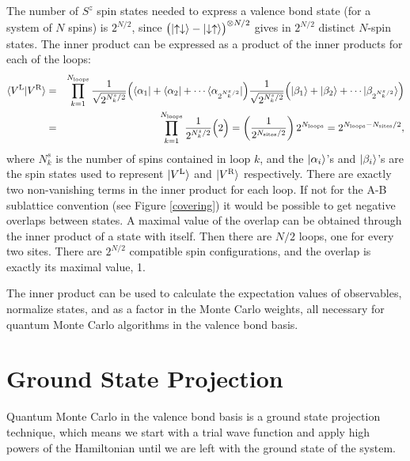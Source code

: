 The number of $S^z$ spin states needed to express a valence bond state (for a system of $N$ spins) is $2^{N/2}$, since $\big(\lvert {\uparrow\downarrow} \rangle-\lvert {\downarrow\uparrow} \rangle \big)^{\otimes N/2}$ gives in $2^{N/2}$ distinct $N$-spin states. 
The inner product can be expressed as a product of the inner products for each of the loops:
\begin{eqnarray}
\label{innprod}
\langle{V^\text{L}}\vert{V^\text{R}}\rangle &= &
				\prod^{N_{\text{loops}}}_{k=1}
				\frac{1}
				{\sqrt{2^{N^s_k/2}}}
				\Big( \langle {\alpha_1} \rvert + \langle {\alpha_2} \rvert + \cdots \langle {\alpha_{2^{N^s_k/2}}} \rvert\Big)
				\frac{1}
				{\sqrt{2^{N^s_k/2}}} \nonumber
				\Big( \lvert {\beta_1} \rangle + \lvert {\beta_2} \rangle + \cdots \lvert {\beta_{2^{N^s_k/2}}} \rangle\Big)\\
				&=&\prod^{N_{\text{loops}}}_{k=1}
				\frac{1}
				{2^{N^s_k/2}}
				\Big( 2\Big)
				= \left(\frac{1}
				{2^{N_{\text{sites}}/2}}\right)
				 2^{N_{\text{loops}}} 
				 = 2^{N_{\text{loops}} - N_{\text{sites}}/2},
\end{eqnarray}
where $N^s_k$ is the number of spins contained in loop $k$, and the $\lvert {\alpha_i} \rangle$'s and 
$\lvert {\beta_i} \rangle$'s are the spin states used to represent $\lvert {V^\text{L}} \rangle$ and $\lvert {V^\text{R}} \rangle$ respectively.
There are exactly two non-vanishing terms in the inner product for each loop.
If not for the A-B sublattice convention (see Figure \ref{covering}) it would be possible to get negative overlaps between states.
A maximal value of the overlap can be obtained through the inner product of a state with itself.
Then there are $N/2$ loops, one for every two sites.  There are $2^{N/2}$ compatible spin configurations, and the overlap is exactly its maximal value, 1.

The inner product can be used to calculate the expectation values of observables, normalize states, and as a factor in the Monte Carlo weights, all necessary for quantum Monte Carlo algorithms in the valence bond basis. 

\section{Ground State Projection} \label{gsp}

Quantum Monte Carlo in the valence bond basis is a ground state projection technique, 
which means we start with a trial wave function and apply high powers of the Hamiltonian until 
we are left with the ground state of the system. 

